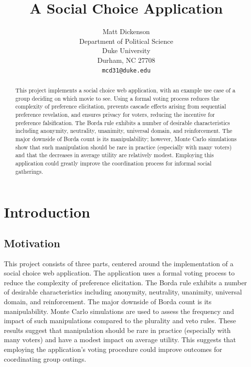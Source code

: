 \documentclass[12pt,letterpaper]{article} %
\title{A Social Choice Application}
\author{
Matt Dickenson\\
Department of Political Science\\
Duke University\\
Durham, NC 27708 \\
\texttt{mcd31@duke.edu}
}
\begin{document}
\begin{titlepage}

\clearpage
\maketitle
\thispagestyle{empty}

\begin{abstract}
This project implements a social choice web application, with an example use case of a group deciding on which movie to see. Using a formal voting process reduces the complexity of preference elicitation, prevents cascade effects arising from sequential preference revelation, and ensures privacy for voters, reducing the incentive for preference falsification. The Borda rule exhibits a number of desirable characteristics including anonymity, neutrality, unanimity, universal domain, and reinforcement. The major downside of Borda count is its manipulability; however, Monte Carlo simulations show that such manipulation should be rare in practice (especially with many voters) and that the decreases in average utility are relatively modest. Employing this application could greatly improve the coordination process for informal social gatherings. 
\end{abstract}

\end{titlepage}



\newpage

\section{Introduction}

\subsection{Motivation}


This project consists of three parts, centered around the implementation of a social choice web application. The application uses a formal voting process to reduce the complexity of preference elicitation. The Borda rule exhibits a number of desirable characteristics including anonymity, neutrality, unanimity, universal domain, and reinforcement. The major downside of Borda count is its manipulability. Monte Carlo simulations are used to assess the frequency and impact of such manipulations compared to the plurality and veto rules. 
These results suggest that manipulation should be rare in practice (especially with many voters) and have a modest impact on average utility. This suggests that employing the application's voting procedure could improve outcomes for coordinating group outings.
\end{document}
